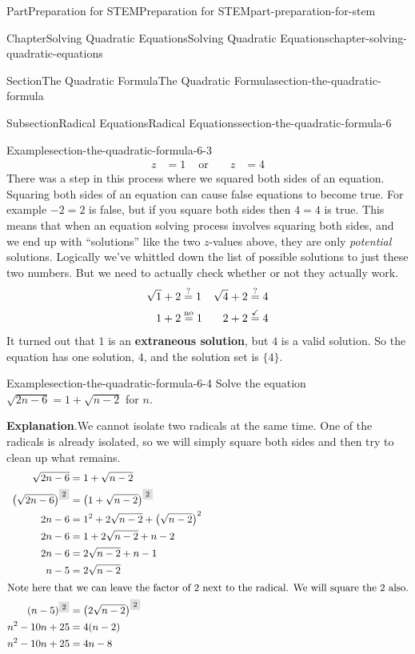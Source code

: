 \documentclass[twoside,10pt,]{book}
\newcommand{\blocktitlefont}{\relax}
\newcommand{\terminology}[1]{\textbf{#1}}
\numberwithin{equation}{section}
\newcommand{\highlight}[1]{\mathchoice{\colorbox{lightsapphire}{$\displaystyle #1$}}{\colorbox{lightsapphire}{$\textstyle #1$}}{\colorbox{lightsapphire}{$\scriptstyle #1$}}{\colorbox{lightsapphire}{$\scriptscriptstyle #1$}}}
\newcommand{\substitute}[1]{{\color{blue}{{#1}}}}
\newcommand{\confirm}[1]{\stackrel{\checkmark}{#1}}
\newcommand{\reject}[1]{\stackrel{\text{no}}{#1}}
\newcommand{\wonder}[1]{\stackrel{\text{?}}{#1}}
\newcommand{\amp}{&}
\begin{document}
\begin{partptx}{Part}{Preparation for STEM}{}{Preparation for STEM}{}{}{part-preparation-for-stem}
\begin{chapterptx}{Chapter}{Solving Quadratic Equations}{}{Solving Quadratic Equations}{}{}{chapter-solving-quadratic-equations}
\begin{sectionptx}{Section}{The Quadratic Formula}{}{The Quadratic Formula}{}{}{section-the-quadratic-formula}
\begin{subsectionptx}{Subsection}{Radical Equations}{}{Radical Equations}{}{}{section-the-quadratic-formula-6}
\begin{example}{Example}{}{section-the-quadratic-formula-6-3}
{\begin{align*}
z\amp=1\amp\text{ or }\amp\amp z\amp=4
\end{align*}
There was a step in this process where we squared both sides of an equation. Squaring both sides of an equation can cause false equations to become true. For example \(-2=2\) is false, but if you square both sides then \(4=4\) is true. This means that when an equation solving process involves squaring both sides, and we end up with ``solutions'' like the two \(z\)-values above, they are only \emph{potential} solutions. Logically we've whittled down the list of possible solutions to just these two numbers. But we need to actually check whether or not they actually work.%
\begin{align*}
\sqrt{\substitute{1}}+2\amp\wonder{=}1\amp\sqrt{\substitute{4}}+2\amp\wonder{=}4\\
1+2\amp\reject{=}1\amp2+2\amp\confirm{=}4
\end{align*}
It turned out that \(1\) is an \terminology{extraneous solution}, but \(4\) is a valid solution. So the equation has one solution, \(4\), and the solution set is \(\{4\}\).%
}\end{example}
\begin{example}{Example}{}{section-the-quadratic-formula-6-4}%
Solve the equation \(\sqrt{2n-6}=1+\sqrt{n-2}\) for \(n\).%
\par\smallskip%
{\makeatletter{}\makeatother\noindent\textbf{\blocktitlefont Explanation}.\hypertarget{section-the-quadratic-formula-6-4-2}{}\quad{}We cannot isolate two radicals at the same time. One of the radicals is already isolated, so we will simply square both sides and then try to clean up what remains.%
\begin{align*}
\sqrt{2n-6}\amp=1+\sqrt{n-2}\\
\left(\sqrt{2n-6}\right)^{\highlight{2}}\amp=\left(1+\sqrt{n-2}\right)^{\highlight{2}}\\
2n-6\amp=1^2+2\sqrt{n-2}+\left(\sqrt{n-2}\right)^2\\
2n-6\amp=1+2\sqrt{n-2}+n-2\\
2n-6\amp=2\sqrt{n-2}+n-1\\
n-5\amp=2\sqrt{n-2}\\
\intertext{Note here that we can leave the factor of \(2\) next to the radical. We will square the \(2\) also.}
(n-5)^{\highlight{2}}\amp=\left(2\sqrt{n-2}\right)^{\highlight{2}}\\
n^2-10n+25\amp=4(n-2)\\
n^2-10n+25\amp=4n-8\\

\end{align*}}
\end{example}
\end{subsectionptx}
\end{sectionptx}
\end{chapterptx}
\end{partptx}
\end{document}
